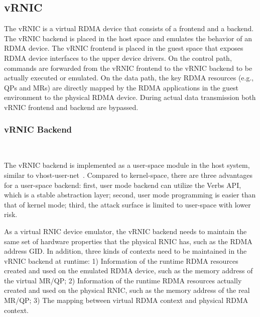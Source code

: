 \subsection{vRNIC}

The vRNIC is a virtual RDMA device that consists of a frontend and a backend. The vRNIC backend is placed in the host space and emulates the behavior of an RDMA device. The vRNIC frontend is placed in the guest space that exposes RDMA device interfaces to the upper device drivers.
On the control path, commands are forwarded from the vRNIC frontend to the vRNIC backend to be actually executed or emulated.
On the data path, the key RDMA resources (e.g., QPs and MRs) are directly mapped by the RDMA applications in the guest environment to the physical RDMA device. During actual data transmission both vRNIC frontend and backend are bypassed.

\subsubsection{\textbf{vRNIC Backend}}
\
\noindent

The vRNIC backend is implemented as a user-space module in the host system, similar to vhost-user-net~\cite{vhost-user-net}. Compared to kernel-space, there are three advantages for a user-space backend: first, user mode backend can utilize the Verbs API, which is a stable abstraction layer; second, user mode programming is easier than that of kernel mode; third, the attack surface is limited to user-space with lower risk.


As a virtual RNIC device emulator, the vRNIC backend needs to maintain the same set of hardware properties that the physical RNIC has, such as the RDMA address GID. In addition, three kinds of contexts need to be maintained in the vRNIC backend at runtime:
1) Information of the runtime RDMA resources created and used on the emulated RDMA device, such as the memory address of the virtual MR/QP;
2) Information of the runtime RDMA resources actually created and used on the physical RNIC, such as the memory address of the real MR/QP;
3) The mapping between virtual RDMA context and physical RDMA context.

